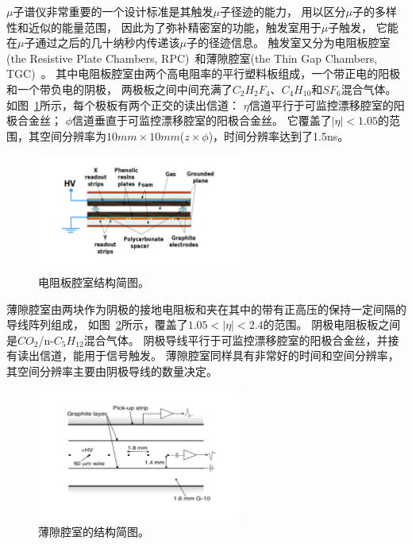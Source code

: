 $\mu$子谱仪非常重要的一个设计标准是其触发$\mu$子径迹的能力，
用以区分$\mu$子的多样性和近似的能量范围，
因此为了弥补精密室的功能，触发室用于$\mu$子触发，
它能在$\mu$子通过之后的几十纳秒内传递该$\mu$子的径迹信息。
触发室又分为电阻板腔室(the Resistive Plate Chambers, RPC)~\cite{ATLASRPC}和薄隙腔室(the Thin Gap Chambers, TGC)~\cite{ATLASTGC}。
其中电阻板腔室由两个高电阻率的平行塑料板组成，一个带正电的阳极和一个带负电的阴极，
两极板之间中间充满了$C_2H_2F_4$、$C_4H_{10}$和$SF_6$混合气体。
如图~\ref{fig:ATLASMS3}所示，每个极板有两个正交的读出信道：
$\eta$信道平行于可监控漂移腔室的阳极合金丝；
$\phi$信道垂直于可监控漂移腔室的阳极合金丝。
它覆盖了$|\eta|<1.05$的范围，其空间分辨率为$10mm\times10mm$($z\times\phi$)，时间分辨率达到了1.5ns。

\begin{figure}
  \begin{center}
    \includegraphics[width=0.6\textwidth]{figuresEXP/ATLASMS3.jpg}
  \end{center}
  \caption{
电阻板腔室结构简图。
  }
    \label{fig:ATLASMS3}
\end{figure}

薄隙腔室由两块作为阴极的接地电阻板和夹在其中的带有正高压的保持一定间隔的导线阵列组成，
如图~\ref{fig:ATLASMS4}所示，覆盖了$1.05<|\eta|<2.4$的范围。
阴极电阻板板之间是$CO_2$/n-$C_5H_{12}$混合气体。
阴极导线平行于可监控漂移腔室的阳极合金丝，并接有读出信道，能用于信号触发。
薄隙腔室同样具有非常好的时间和空间分辨率，其空间分辨率主要由阴极导线的数量决定。


\begin{figure}
  \begin{center}
    \includegraphics[width=0.6\textwidth]{figuresEXP/ATLASMS4.jpg}
  \end{center}
  \caption{
薄隙腔室的结构简图。
  }
    \label{fig:ATLASMS4}
\end{figure}

